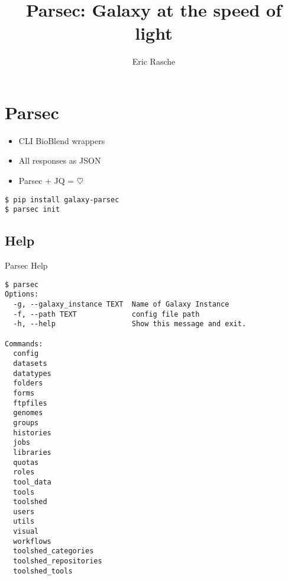 \documentclass[12pt]{phage3slides} %
\title[Parsec]{Parsec: Galaxy at the speed of light}
\author[erasche]{Eric Rasche}
\begin{document}
\frame{\titlepage}


\section{Parsec}
\begin{frame}[fragile]
	\begin{itemize}
		\item CLI BioBlend wrappers
		\item All responses as JSON
		\item Parsec + JQ = $\heartsuit$
	\end{itemize}
\begin{verbatim}
$ pip install galaxy-parsec
$ parsec init
\end{verbatim}
\end{frame}


\subsection{Help}
\begin{frame}[fragile]{Parsec Help}

\begin{verbatim}
$ parsec
Options:
  -g, --galaxy_instance TEXT  Name of Galaxy Instance
  -f, --path TEXT             config file path
  -h, --help                  Show this message and exit.

Commands:
  config
  datasets
  datatypes
  folders
  forms
  ftpfiles
  genomes
  groups
  histories
  jobs
  libraries
  quotas
  roles
  tool_data
  tools
  toolshed
  users
  utils
  visual
  workflows
  toolshed_categories
  toolshed_repositories
  toolshed_tools
\end{verbatim}
\end{frame}
\end{document}

